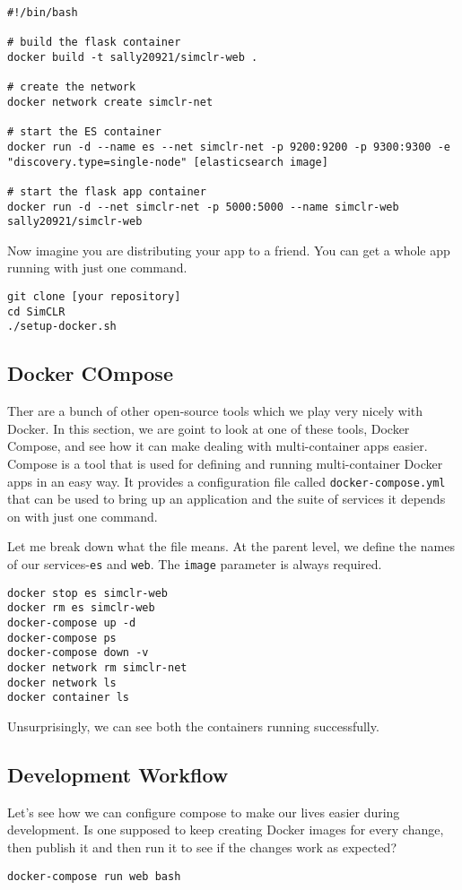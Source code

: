 \documentclass[twoside,twocolumn]{article}
\begin{document}
\begin{verbatim}
#!/bin/bash

# build the flask container
docker build -t sally20921/simclr-web .

# create the network
docker network create simclr-net

# start the ES container
docker run -d --name es --net simclr-net -p 9200:9200 -p 9300:9300 -e "discovery.type=single-node" [elasticsearch image]

# start the flask app container
docker run -d --net simclr-net -p 5000:5000 --name simclr-web sally20921/simclr-web
\end{verbatim}

Now imagine you are distributing your app to a friend. You can get a whole app running with just one command.
\begin{verbatim}
git clone [your repository]
cd SimCLR
./setup-docker.sh
\end{verbatim}

\subsection{Docker COmpose}
Ther are a bunch of other open-source tools which we play very nicely with Docker.
In this section, we are goint to look at one of these tools, Docker Compose, and see how it can make dealing with multi-container apps easier.
Compose is a tool that is used for defining and running multi-container Docker apps in an easy way.
It provides a configuration file called \texttt{docker-compose.yml} that can be used to bring up an application and the suite of services it depends on with just one command.

Let me break down what the file means. At the parent level, we define the names of our services-\texttt{es} and \texttt{web}.
The \texttt{image} parameter is always required.

\begin{verbatim}
docker stop es simclr-web
docker rm es simclr-web
docker-compose up -d 
docker-compose ps
docker-compose down -v
docker network rm simclr-net
docker network ls 
docker container ls 
\end{verbatim}
Unsurprisingly, we can see both the containers running successfully.

\subsection{Development Workflow}
Let's see how we can configure compose to make our lives easier during development.
Is one supposed to keep creating Docker images for every change, then publish it and then run it to see if the changes work as expected?
\begin{verbatim}
docker-compose run web bash
\end{verbatim}
\end{document}
